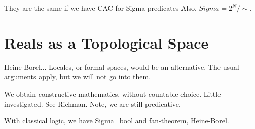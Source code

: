 They are the same if we have CAC for Sigma-predicates
Also, $Sigma = 2^N/\sim$.


\section{Reals as a Topological Space}
\label{sec:reals-as-topological}

Heine-Borel... Locales, or formal spaces, would be an alternative. The usual arguments
apply, but we will not go into them.

We obtain constructive mathematics, without countable choice. Little investigated.
See Richman. Note, we are still predicative.

With classical logic, we have Sigma=bool and fan-theorem, Heine-Borel.


